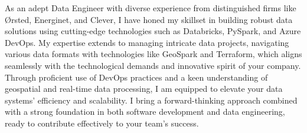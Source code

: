 
As an adept Data Engineer with diverse experience from distinguished firms like Ørsted, Energinet, and Clever, I have honed my skillset in building robust data solutions using cutting-edge technologies such as Databricks, PySpark, and Azure DevOps.
 My expertise extends to managing intricate data projects, navigating various data formats with technologies like GeoSpark and Terraform, which aligns seamlessly with the technological demands and innovative spirit of your company.
 Through proficient use of DevOps practices and a keen understanding of geospatial and real-time data processing, I am equipped to elevate your data systems' efficiency and scalability.
 I bring a forward-thinking approach combined with a strong foundation in both software development and data engineering, ready to contribute effectively to your team's success.

